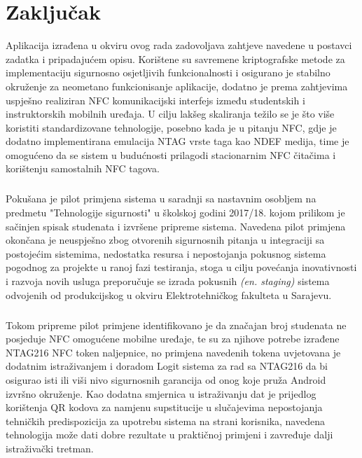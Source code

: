 \chapter{Zaključak}
Aplikacija izrađena u okviru ovog rada zadovoljava zahtjeve navedene u postavci zadatka i pripadajućem opisu. Korištene su savremene kriptografske metode za implementaciju sigurnosno osjetljivih funkcionalnosti i osigurano je stabilno okruženje za neometano funkcionisanje aplikacije, dodatno je prema zahtjevima uspješno realiziran NFC komunikacijski interfejs između studentskih i instruktorskih mobilnih uređaja. U cilju lakšeg skaliranja težilo se je što više koristiti standardizovane tehnologije, posebno kada je u pitanju NFC, gdje je dodatno implementirana emulacija NTAG vrste taga kao NDEF medija, time je omogućeno da se sistem u budućnosti prilagodi stacionarnim NFC čitačima i korištenju samostalnih NFC tagova.

\paragraph*{}
Pokušana je pilot primjena sistema u saradnji sa nastavnim osobljem na predmetu "Tehnologije sigurnosti" u školskoj godini 2017/18. kojom prilikom je sačinjen spisak studenata i izvršene pripreme sistema. Navedena pilot primjena okončana je neuspješno zbog otvorenih sigurnosnih pitanja u integraciji sa postojećim sistemima, nedostatka resursa i nepostojanja pokusnog sistema pogodnog za projekte u ranoj fazi testiranja, stoga u cilju povećanja inovativnosti i razvoja novih usluga preporučuje se izrada pokusnih \textit{(en. staging)} sistema odvojenih od produkcijskog u okviru Elektrotehničkog fakulteta u Sarajevu.

\paragraph*{}
Tokom pripreme pilot primjene identifikovano je da značajan broj studenata ne posjeduje NFC omogućene mobilne uređaje, te su za njihove potrebe izrađene NTAG216 NFC token naljepnice, no primjena navedenih tokena uvjetovana je dodatnim istraživanjem i doradom Logit sistema za rad sa NTAG216 da bi osigurao isti ili viši nivo sigurnosnih garancija od onog koje pruža Android izvršno okruženje. Kao dodatna smjernica u istraživanju dat je prijedlog korištenja QR kodova za namjenu supstitucije u slučajevima nepostojanja tehničkih predispozicija za upotrebu sistema na strani korisnika, navedena tehnologija može dati dobre rezultate u praktičnoj primjeni i zavređuje dalji istraživački tretman.

